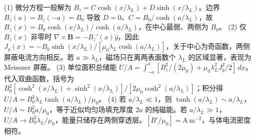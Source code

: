 (1) 微分方程一般解为 \(B_z=C\cosh(x/\lambda_L)+D\sinh(x/\lambda_L)\)。边界 \(B_z(a)=B_z(-a)=B_0\) 导致 \(D=0\)、\(C=B_0/\cosh(a/\lambda_L)\)，故 \(B_z(x)=B_0\cosh(x/\lambda_L)/\cosh(a/\lambda_L)\)，在中心最弱、两侧为 \(B_0\)。
(2) 仅 \(B_z(x)\) 非零时 \(\nabla\times\mathbf B=-B_z'(x)\hat y\)，因此 \(J_y(x)=-B_0\sinh(x/\lambda_L)/[\mu_0\lambda_L\cosh(a/\lambda_L)]\)，关于中心为奇函数，两侧屏蔽电流方向相反。若 \(a\gg\lambda_L\)，磁场只在离两表面数个 \(\lambda_L\) 的区域显著，表现为 Meissner 屏蔽。
(3) 单位面积总储能 \(U/A=\int_{-a}^a[B_z^2/(2\mu_0)+\mu_0\lambda_L^2J_y^2/2]\,dx\)。代入双曲函数，括号为 \(B_0^2[\cosh^2(x/\lambda_L)+\sinh^2(x/\lambda_L)]/[2\mu_0\cosh^2(a/\lambda_L)]\)；积分得 \(U/A=B_0^2\lambda_L\tanh(a/\lambda_L)/\mu_0\)。
(4) 若 \(a/\lambda_L\ll1\)，则 \(\tanh(a/\lambda_L)\sim a/\lambda_L\)，\(U/A\sim B_0^2a/\mu_0\)，等于近似均匀场填充厚度 \(2a\) 的纯磁能。若 \(a/\lambda_L\gg1\)，\(U/A\to B_0^2\lambda_L/\mu_0\)，能量只储存在两侧穿透层。\([B'/\mu_0]=\mathrm{A\,m^{-2}}\)，与体电流密度相符。
